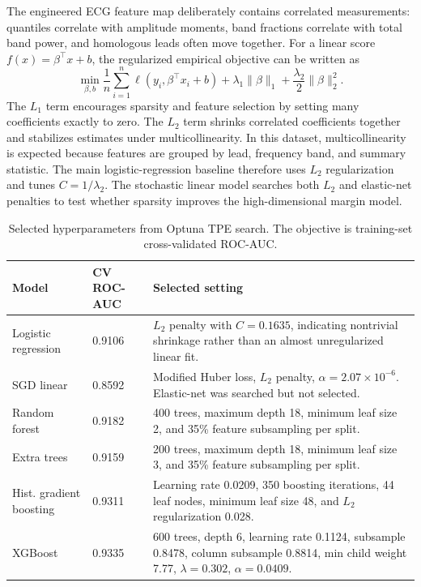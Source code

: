 \documentclass{article}
\begin{document}
The engineered ECG feature map deliberately contains correlated measurements: quantiles correlate with amplitude moments, band fractions correlate with total band power, and homologous leads often move together. For a linear score \(f(x)=\beta^\top x+b\), the regularized empirical objective can be written as
\begin{equation}
  \min_{\beta,b}
  \frac{1}{n}\sum_{i=1}^{n}\ell(y_i,\beta^\top x_i+b)
  +\lambda_1\|\beta\|_1+\frac{\lambda_2}{2}\|\beta\|_2^2.
  \label{eq:regularized-linear}
\end{equation}
The \(L_1\) term encourages sparsity and feature selection by setting many coefficients exactly to zero. The \(L_2\) term shrinks correlated coefficients together and stabilizes estimates under multicollinearity. In this dataset, multicollinearity is expected because features are grouped by lead, frequency band, and summary statistic. The main logistic-regression baseline therefore uses \(L_2\) regularization and tunes \(C=1/\lambda_2\). The stochastic linear model searches both \(L_2\) and elastic-net penalties to test whether sparsity improves the high-dimensional margin model.

\begin{table}[H]
  \centering
  \caption{Selected hyperparameters from Optuna TPE search. The objective is training-set cross-validated ROC-AUC.}
  \label{tab:hyperparams}
  \small
  \begin{tabular}{llp{7.4cm}}
    \toprule
    Model & CV ROC-AUC & Selected setting \\
    \midrule
    Logistic regression & 0.9106 & \(L_2\) penalty with \(C=0.1635\), indicating nontrivial shrinkage rather than an almost unregularized linear fit. \\
    SGD linear & 0.8592 & Modified Huber loss, \(L_2\) penalty, \(\alpha=2.07{\times}10^{-6}\). Elastic-net was searched but not selected. \\
    Random forest & 0.9182 & 400 trees, maximum depth 18, minimum leaf size 2, and 35\% feature subsampling per split. \\
    Extra trees & 0.9159 & 200 trees, maximum depth 18, minimum leaf size 3, and 35\% feature subsampling per split. \\
    Hist. gradient boosting & 0.9311 & Learning rate 0.0209, 350 boosting iterations, 44 leaf nodes, minimum leaf size 48, and \(L_2\) regularization 0.028. \\
    XGBoost & 0.9335 & 600 trees, depth 6, learning rate 0.1124, subsample 0.8478, column subsample 0.8814, min child weight 7.77, \(\lambda=0.302\), \(\alpha=0.0409\). \\
    \bottomrule
  \end{tabular}
\end{table}
\end{document}
